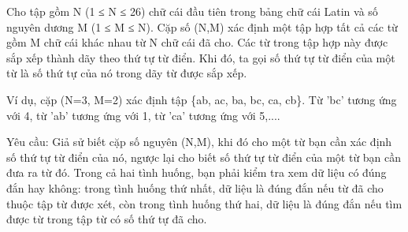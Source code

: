 Cho tập gồm N (1 ≤ N ≤ 26) chữ cái đầu tiên trong bảng chữ cái Latin và số nguyên dương M (1 ≤ M ≤ N). Cặp số (N,M) xác định một tập hợp tất cả các từ gồm M chữ cái khác nhau từ N chữ cái đã cho. Các từ trong tập hợp này được sắp xếp thành dãy theo thứ tự từ điển. Khi đó, ta gọi số thứ tự từ điển của một từ là số thứ tự của nó trong dãy từ được sắp xếp.  

   Ví dụ, cặp (N=3, M=2) xác định tập \{ab, ac, ba, bc, ca, cb\}. Từ 'bc' tương ứng với 4, từ 'ab' tương ứng với 1, từ 'ca' tương ứng với 5,....  

   Yêu cầu: Giả sử biết cặp số nguyên (N,M), khi đó cho một từ bạn cần xác định số thứ tự từ điển của nó, ngược lại cho biết số thứ tự từ điển của một từ bạn cần đưa ra từ đó. Trong cả hai tình huống, bạn phải kiểm tra xem dữ liệu có đúng đắn hay không: trong tình huống thứ nhất, dữ liệu là đúng đắn nếu từ đã cho thuộc tập từ được xét, còn trong tình huống thứ hai, dữ liệu là đúng đắn nếu tìm được từ trong tập từ có số thứ tự đã cho.